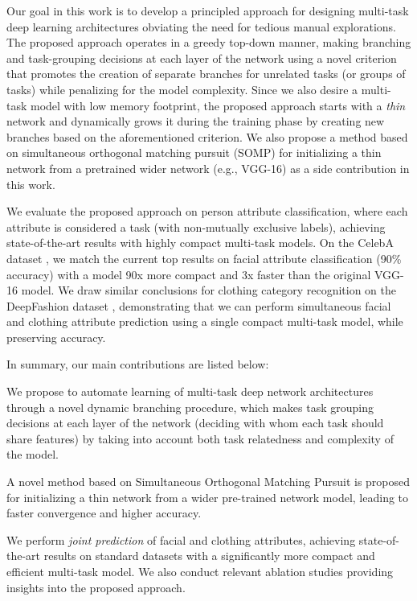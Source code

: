 \documentclass[10pt,twocolumn,letterpaper]{article}
\begin{document}
Our goal in this work is to develop a principled approach for designing multi-task deep learning
architectures obviating the need for tedious manual explorations. The proposed approach operates in a greedy
top-down manner, making branching and task-grouping decisions at each layer of the network using
a novel criterion that promotes the creation of separate branches for unrelated tasks (or groups of tasks) while 
penalizing for the model complexity. Since we also desire  a multi-task model with low memory 
footprint, the proposed approach starts with a \emph{thin} network and dynamically grows it
during the training phase by creating new branches based on the aforementioned criterion. 
We also propose a method based on simultaneous orthogonal matching pursuit (SOMP) \cite{somp}
for initializing a thin network from a pretrained wider network
(e.g., VGG-16) as a side contribution in this work.  

We evaluate the proposed approach on person attribute classification, where each attribute is considered a task (with non-mutually exclusive labels),
achieving state-of-the-art results with highly compact multi-task models.
On the CelebA dataset \cite{liu2015deep}, we match the current top results on facial attribute classification (90\% accuracy) with a model 90x more compact and 3x faster than the original VGG-16 model. We draw similar conclusions for clothing category recognition on the DeepFashion dataset \cite{liu2016deepfashion}, demonstrating that we can perform simultaneous facial and clothing attribute prediction using a single compact multi-task model, while preserving accuracy.

\noindent In summary, our main contributions are listed below:
\begin{compactitem}[$\circ$]
	\item We propose to automate learning of multi-task deep network architectures through a novel dynamic branching procedure,
	which makes task grouping decisions at each layer of the network (deciding with whom each task should share features) by 
	taking into account both task relatedness and complexity of the model.
	
	\item A novel method based on Simultaneous Orthogonal Matching Pursuit is proposed for initializing a thin network from a wider pre-trained network model,
	leading to faster convergence and higher accuracy.
	
	\item We perform {\em joint prediction} of facial and clothing attributes, achieving state-of-the-art results on standard datasets with a significantly 
	more compact and efficient multi-task model.  We also conduct relevant ablation studies providing insights into the proposed approach. 
\end{compactitem}
\end{document}
